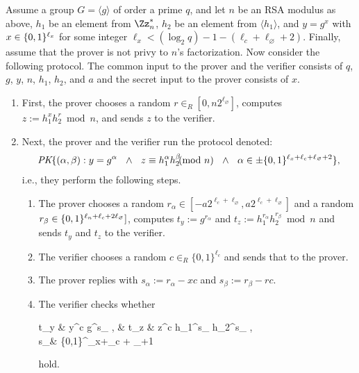 Assume a group $G = \langle g \rangle$ of order a prime $q$,
and let $n$ be an RSA modulus as above,  $h_1$ be an element
from $\Zs{n}$, $h_2$ be an element from $\langle h_1 \rangle$, and
$y = g^x$ with $x \in \{0,1\}^{\ell_x}$ for some integer $\ell_x < (\log_2 q) - 1 - ( \ell_c 
+ \ell_\varnothing + 2) $. 
Finally, assume that the prover is not privy to $n$'s factorization.
Now consider the following protocol.
The common input to the prover and the verifier consists of $q$, $g$, $y$, $n$, $h_1$,  $h_2$, and $a$
and the secret input to the prover consists of $x$. 
\begin{enumerate}
\item First, the prover chooses a random $r \in_R [0,n 2^{\ell_\varnothing}]$, computes
$z := h_1^x h_2^r \bmod{n}$, and sends $z$ to the verifier.
\item Next, the prover and the verifier run the protocol denoted:
\begin{multline*}
\textit{PK}\{(\alpha,\beta ): y = g^\alpha 
\ \ \wedge \ \
 z \equiv h_1^\alpha h_2^\beta \!\!\!\!\pmod{n} \ \ \wedge \ \
\alpha \in  \pm\{0,1\}^{\ell_x+\ell_c + \ell_\varnothing+2}\},
\end{multline*}
i.e., they perform the following 
steps.
\begin{enumerate}
\item The prover chooses a random $r_\alpha \in [-a2^{\ell_c + \ell_\varnothing}, a2^{\ell_c + \ell_\varnothing}] $
and a random $r_\beta \in \{0,1\}^{\ell_n+\ell_c + 2 \ell_\varnothing}] $, computes
$t_y := g^{r_\alpha}$ and $t_z := h_1^{r_\alpha} h_2^{r_\beta} \bmod{n}$ and 
sends $t_y$ and $t_z$ to the verifier.
\item The verifier chooses a random $c \in_R \{0,1\}^{\ell_c}$ and sends that to the 
prover.
\item The prover replies with $s_\alpha := r_\alpha - xc$ and 
$s_\beta := r_\beta - r c$.
\item The verifier checks whether 
\begin{xalignat*}{2}
t_y &   y^c g^{s_\alpha} \quad, &
t_z &  z^c h_1^{s_\alpha} h_2^{s_\beta} 
\quad, \ \text{and}\quad \\
s_\alpha &\stackrel{?}{\in}  \pm \{0,1\}^{\ell_x+\ell_c + \ell_\varnothing+1}
\end{xalignat*}
hold.
\end{enumerate}
\end{enumerate}

